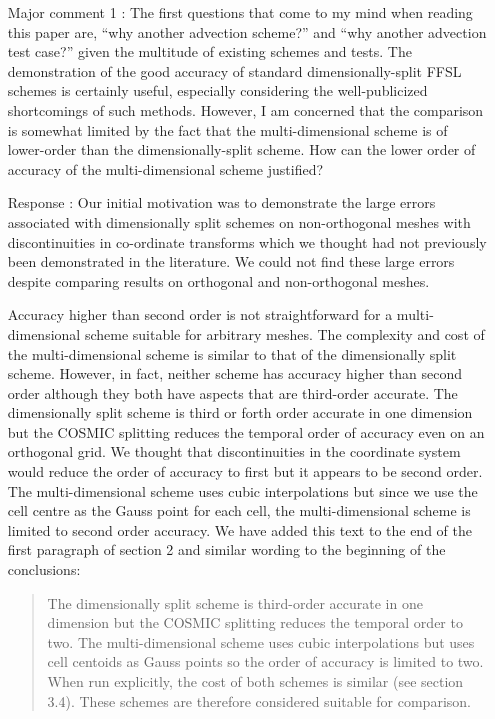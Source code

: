 \documentclass[12pt]{article}
\begin{document}
\begin{enumerate}
\item [Major comment 1]: The first questions that come to my mind when reading this paper are, ``why another advection scheme?'' and ``why another advection test case?'' given the multitude of existing schemes and tests. The demonstration of the good accuracy of standard dimensionally-split FFSL schemes is certainly useful, especially considering the well-publicized shortcomings of such methods. However, I am concerned that the comparison is somewhat limited by the fact that the multi-dimensional scheme is of lower-order than the dimensionally-split scheme. How can the lower order of accuracy of the multi-dimensional scheme justified?

\item [Response]: 
Our initial motivation was to demonstrate the large errors associated with dimensionally split schemes on non-orthogonal meshes with discontinuities in co-ordinate transforms which we thought had not previously been demonstrated in the literature. We could not find these large errors despite comparing results on orthogonal and non-orthogonal meshes. 

Accuracy higher than second order is not straightforward for a multi-dimensional scheme suitable for arbitrary meshes. The complexity and cost of the multi-dimensional scheme is similar to that of the dimensionally split scheme. However, in fact, neither scheme has accuracy higher than second order although they both have aspects that are third-order accurate. The dimensionally split scheme is third or forth order accurate in one dimension but the COSMIC splitting reduces the temporal order of accuracy even on an orthogonal grid. We thought that discontinuities in the coordinate system would reduce the order of accuracy to first but it appears to be second order. The multi-dimensional scheme uses cubic interpolations but since we use the cell centre as the Gauss point for each cell, the multi-dimensional scheme is limited to second order accuracy. We have added this text to the end of the first paragraph of section 2 and similar wording to the beginning of the conclusions:
\begin{quote}
The dimensionally split scheme is third-order accurate in one dimension but the COSMIC splitting reduces the temporal order to two. The multi-dimensional scheme uses cubic interpolations but uses cell centoids as Gauss points so the order of accuracy is limited to two. When run explicitly, the cost of both schemes is similar (see section 3.4). These schemes are therefore considered suitable for comparison. 
\end{quote}


\end{enumerate}
\end{document}
